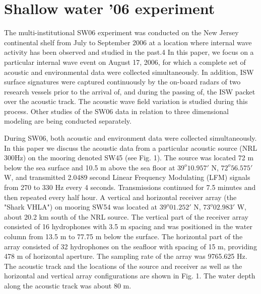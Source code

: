 
\chapter{Shallow water '06 experiment }

The multi-institutional SW06 experiment was conducted on the New
Jersey continental shelf from July to September 2006 at a location
where internal wave activity has been observed and studied in the
past.4 In this paper, we focus on a particular internal wave event
on August 17, 2006, for which a complete set of acoustic and
environmental data were collected simultaneously. In addition, ISW
surface signatures were captured continuously by the on-board radars
of two research vessels prior to the arrival of, and during the
passing of, the ISW packet over the acoustic track. The acoustic
wave field variation is studied during this process. Other studies
of the SW06 data in relation to three dimensional modeling are being
conducted separately.

During SW06, both acoustic and environment data were collected
simultaneously. In this paper we discuss the acoustic data from a
particular acoustic source (NRL 300Hz) on the mooring denoted SW45
(see Fig. 1). The source was located 72 m below the sea surface and
10.5 m above the sea floor at $39^{o}10.957'$ N, $72^o56.575'$ W, and
transmitted 2.0489 second Linear Frequency Modulating (LFM) signals
from 270 to 330 Hz every 4 seconds. Transmissions continued for 7.5
minutes and then repeated every half hour.  A vertical and
horizontal receiver array (the "Shark VHLA") on mooring SW54 was
located at $39^o01.252'$ N, $73^o02.983'$ W, about 20.2 km south of the
NRL source.  The vertical part of the receiver array consisted of 16
hydrophones with 3.5 m spacing and was positioned in the water
column from 13.5 m to 77.75 m below the surface. The horizontal part
of the array consisted of 32 hydrophones on the seafloor with
spacing of 15 m, providing 478 m of horizontal aperture. The
sampling rate of the array was 9765.625 Hz. The acoustic track and
the locations of the source and receiver as well as the horizontal
and vertical array configurations are shown in Fig. 1. The water
depth along the acoustic track was about 80 m.
